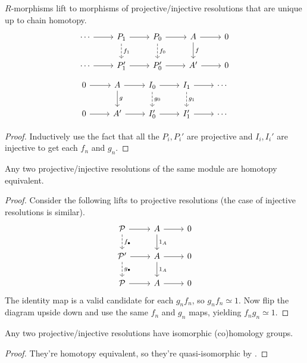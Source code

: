 \documentclass[twoside,10pt]{report}
\begin{document}
\begin{prop}
$R$-morphisms lift to morphisms of projective/injective resolutions that are unique up to chain homotopy.
\[
\begin{tikzcd}
	\cdots \rar & P_1 \rar\dar[dashed]{f_1} & P_0 \rar\dar[dashed]{f_0} & A \rar\dar{f} & 0 \\
	\cdots \rar & P_1' \rar & P_0' \rar & A' \rar & 0
\end{tikzcd}
\]
\[
	\begin{tikzcd}
		0 \rar & A \rar\dar{g} & I_{0} \rar\dar[dashed]{g_0} & I_{1} \rar\dar[dashed]{g_1} & \cdots \\
		0 \rar & A' \rar & I_{0}' \rar & I_1' \rar & \cdots
\end{tikzcd}
\] 
\end{prop}
\begin{proof}
	Inductively use the fact that all the $P_i,P_i'$ are projective and $I_{i}, I_{i}'$ are injective to get each $f_n$ and $g_{n}$. 
\end{proof}

\begin{cor}
	\label{resolutions-homotopy-equiv}
Any two projective/injective resolutions of the same module are homotopy equivalent.
\end{cor}
\begin{proof}
	Consider the following lifts to projective resolutions (the case of injective resolutions is similar).
	\[
		\begin{tikzcd}
			\mathcal{P} \rar\dar[dashed]{f_{\bullet}} & A \rar\dar{1_A} & 0 \\
			\mathcal{P}' \rar\dar[dashed]{g_{\bullet}} & A \rar\dar{1_{A}} & 0 \\
			\mathcal{P} \rar & A \rar & 0
		\end{tikzcd}
	\] 
	The identity map is a valid candidate for each $g_n f_n$, so $g_n f_n \simeq 1$. Now flip the diagram upside down and use the same $f_n$ and $g_n$ maps, yielding $f_n g_n \simeq 1$.
\end{proof}

\begin{cor}
	Any two projective/injective resolutions have isomorphic (co)homology groups.
\end{cor}
\begin{proof}
	They're homotopy equivalent, so they're quasi-isomorphic by .
\end{proof}

\end{document}
